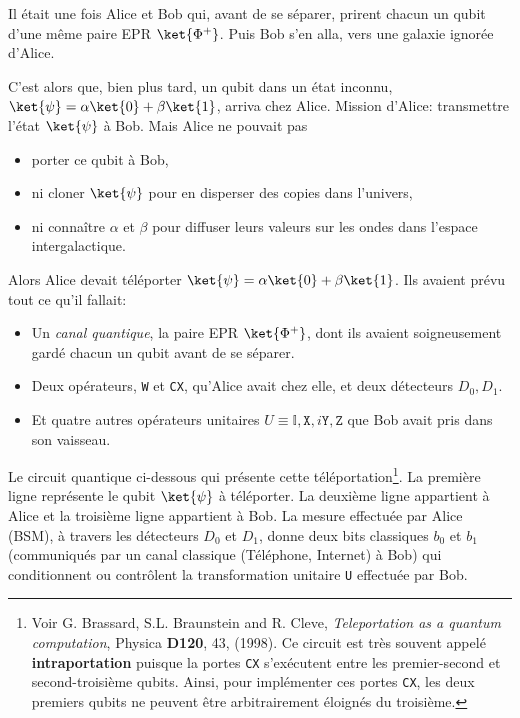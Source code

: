Il était une fois Alice et Bob qui, avant de se séparer, prirent chacun un qubit
d'une même paire EPR $\ket{\Phi^{+}}$. Puis Bob s'en alla, vers une galaxie
ignorée d'Alice.

C'est alors que, bien plus tard, un qubit dans un état inconnu, $\ket{\psi}
=\alpha\ket{0}+\beta\ket{1}$, arriva chez Alice. Mission d'Alice: transmettre
l'état $\ket{\psi}$ à Bob. Mais Alice ne pouvait pas
\begin{itemize}
\item porter ce qubit à Bob,
\item ni cloner $\ket{\psi}$ pour en disperser des copies dans l'univers,
\item ni connaître $\alpha$ et $\beta$ pour diffuser leurs valeurs sur les ondes
dans l'espace intergalactique.
\end{itemize}
Alors Alice devait téléporter $\ket{\psi}=\alpha\ket{0}+\beta\ket{1}$. Ils
avaient prévu tout ce qu'il fallait:
\begin{itemize}
 \item Un \emph{canal quantique}, la paire EPR $\ket{\Phi^{+}}$, dont ils
avaient soigneusement gardé chacun un qubit avant de se séparer.

\item Deux opérateurs, \texttt{W} et \texttt{CX}, qu'Alice avait chez elle, et
deux détecteurs $D_0,D_1$.

\item Et quatre autres opérateurs unitaires $U\equiv\mathbb{I},\mathtt{X},
i\mathtt{Y},\mathtt{Z}$ que Bob avait pris dans son vaisseau.
\end{itemize}

Le circuit quantique ci-dessous qui présente cette téléportation\footnote{Voir
G. Brassard, S.L. Braunstein and R. Cleve, \emph{Teleportation as a quantum
computation}, Physica \textbf{D120}, 43, (1998). Ce circuit est très souvent
appelé \textbf{intraportation} puisque la portes \texttt{CX} s'exécutent entre
les premier-second et second-troisième qubits. Ainsi, pour implémenter ces
portes \texttt{CX}, les deux premiers qubits ne peuvent être arbitrairement
éloignés du troisième.}. La première ligne représente le qubit $\ket{\psi}$ à
téléporter. La deuxième ligne appartient à Alice et la troisième ligne
appartient à Bob. La mesure effectuée par Alice (BSM), à travers les détecteurs
$D_0$ et $D_1$, donne deux bits classiques $b_0$ et $b_1$ (communiqués par un
canal classique (Téléphone, Internet) à Bob) qui conditionnent ou contrôlent la
transformation unitaire \texttt{U} effectuée par Bob.

